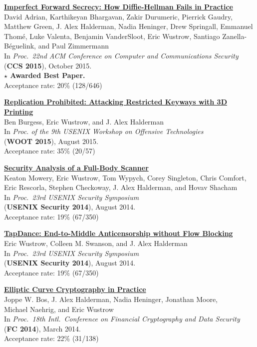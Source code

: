 \documentclass[margin,11pt]{res} %
\begin{document}
    \textbf{\href{https://weakdh.org/}{Imperfect Forward Secrecy: How Diffie-Hellman Fails in Practice}} \\
    David Adrian, Karthikeyan Bhargavan, Zakir Durumeric, Pierrick Gaudry, Matthew Green,
    J. Alex Halderman, Nadia Heninger, Drew Springall, Emmanuel Thomé, Luke Valenta,
    Benjamin VanderSloot, Eric Wustrow, Santiago Zanella-Béguelink, and Paul Zimmermann \\
    In \emph{Proc.\ 22nd ACM Conference on Computer and Communications Security} \\
    (\textbf{CCS 2015}), October 2015. \\
    \textbf{$\star$ Awarded Best Paper.} \\
    Acceptance rate: 20\% (128/646)

    \textbf{\href{https://keysforge.com/}{Replication Prohibited: Attacking Restricted Keyways with 3D Printing}} \\
    Ben Burgess, Eric Wustrow, and J. Alex Halderman \\
    In \emph{Proc. of the 9th USENIX Workshop on Offensive Technologies} \\
    (\textbf{WOOT 2015}), August 2015. \\
    Acceptance rate: 35\% (20/57)

    \textbf{\href{https://www.radsec.org/paper.html}{Security Analysis of a Full-Body Scanner}} \\
    Keaton Mowery, Eric Wustrow, Tom Wypych, Corey Singleton, Chris Comfort, Eric Rescorla, Stephen Checkoway, J. Alex Halderman, and Hovav Shacham \\
    In \emph{Proc.\ 23rd USENIX Security Symposium} \\
    (\textbf{USENIX Security 2014}), August 2014. \\
    Acceptance rate: 19\% (67/350)

\newpage
    \textbf{\href{https://jhalderm.com/pub/papers/tapdance-sec14.pdf}{TapDance: End-to-Middle Anticensorship without Flow Blocking}} \\
    Eric Wustrow, Colleen M. Swanson, and J. Alex Halderman \\
    In \emph{Proc.\ 23rd USENIX Security Symposium} \\
    (\textbf{USENIX Security 2014}), August 2014. \\
    Acceptance rate: 19\% (67/350)

    \textbf{\href{http://eprint.iacr.org/2013/734}{Elliptic Curve Cryptography in Practice}} \\
    Joppe W. Bos, J. Alex Halderman, Nadia Heninger, Jonathan Moore,\\ Michael Naehrig, and Eric Wustrow \\
    In \emph{Proc.\ 18th Intl.\ Conference on Financial Cryptography and Data Security} \\
    (\textbf{FC 2014}), March 2014. \\
    Acceptance rate: 22\% (31/138)
\end{document}

